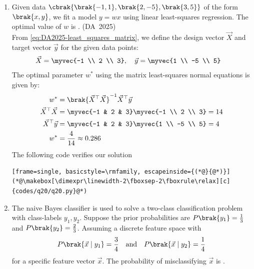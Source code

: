 \begin{enumerate}[label=\thesubsection.\arabic*, ref=\thesubsection.\theenumi]
\item 
Given data $\cbrak{\brak{-1, 1}, \brak{2, -5}, \brak{3, 5}}$ of the form $\brak{x, y}$, we fit a model $y = wx$ using linear least-squares regression. The optimal value of $w$ is \underline{\hspace{1.5cm}}.
\hfill (DA~2025)
\\
\solution
From \eqref{eq:DA2025-least_squares_matrix}, we define the design vector $\vec{X}$ and target vector $\vec{y}$ for the given data points:
\begin{align}
	\vec{X} &= \myvec{-1 \\ 2 \\ 3}, \quad \vec{y} = \myvec{1 \\ -5 \\ 5}
\end{align}
The optimal parameter $w^*$ using the matrix least-squares normal equations is given by:
\begin{align}
	w^* &= \brak{\vec{X}^\top \vec{X}}^{-1} \vec{X}^\top \vec{y}
	\\
	\vec{X}^\top \vec{X} &= \myvec{-1 & 2 & 3} \myvec{-1 \\ 2 \\ 3} = 14
	\\
	\vec{X}^\top \vec{y} &= \myvec{-1 & 2 & 3} \myvec{1 \\ -5 \\ 5} = 4
	\\
	w^* &= \frac{4}{14} \approx 0.286
\end{align}
			The following code verifies our solution
\begin{lstlisting}[frame=single, basicstyle=\rmfamily, escapeinside={(*@}{@*)}]
(*@\makebox[\dimexpr\linewidth-2\fboxsep-2\fboxrule\relax][c]{codes/q20/q20.py}@*)
\end{lstlisting}
	\item 
	The naive Bayes classifier is used to solve a two-class classification problem with class-labels $y_1, y_2$. Suppose the prior probabilities are $P\brak{y_1} = \frac{1}{3}$ and $P\brak{y_2} = \frac{2}{3}$. Assuming a discrete feature space with
	\begin{align}
		P\brak{\vec{x} \mid y_1} = \frac{3}{4} \quad \text{and} \quad P\brak{\vec{x} \mid y_2} = \frac{1}{4}
	\end{align}
	for a specific feature vector $\vec{x}$. The probability of misclassifying $\vec{x}$ is \underline{\hspace{1.5cm}}.

\end{enumerate}

